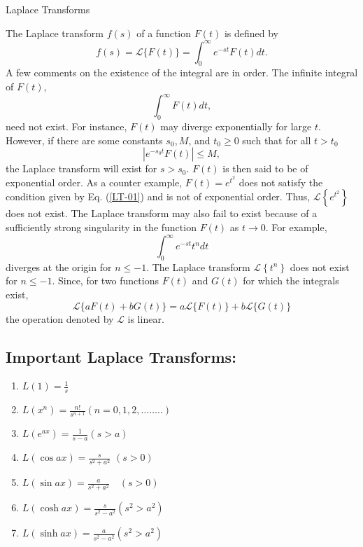 \begin{abox}
	Laplace Transforms
	\end{abox}

The Laplace transform $f(s)$ of a function $F(t)$ is defined by 
\begin{equation}
f(s)=\mathcal{L}\{F(t)\}=\int_{0}^{\infty} e^{-s t} F(t) d t .
\end{equation}
A few comments on the existence of the integral are in order. The infinite integral of $F(t)$,
\begin{equation*}
\int_{0}^{\infty} F(t) d t,
\end{equation*}
need not exist. For instance, $F(t)$ may diverge exponentially for large $t$. However, if there are some constants $s_{0}, M$, and $t_{0} \geq 0$ such that for all $t>t_{0}$
\begin{equation}
\left|e^{-s_{0} t} F(t)\right| \leq M,\label{LT-01}
\end{equation}
the Laplace transform will exist for $s>s_{0} $. $F(t)$ is then said to be of exponential order. As a counter example, $F(t)=e^{t^{2}}$ does not satisfy the condition given by Eq. (\ref{LT-01}) and is not of exponential order. Thus, $\mathcal{L}\left\{e^{t^{2}}\right\}$ does not exist.
The Laplace transform may also fail to exist because of a sufficiently strong singularity in the function $F(t)$ as $t \rightarrow 0$. For example,
\begin{equation*}
\int_{0}^{\infty} e^{-s t} t^{n} d t
\end{equation*}
diverges at the origin for $n \leq-1$. The Laplace transform $\mathcal{L}\left\{t^{n}\right\}$ does not exist for $n \leq-1$. Since, for two functions $F(t)$ and $G(t)$ for which the integrals exist,
\begin{equation}
\mathcal{L}\{a F(t)+b G(t)\}=a \mathcal{L}\{F(t)\}+b \mathcal{L}\{G(t)\}
\end{equation}
the operation denoted by $\mathcal{L}$ is linear.\\
\subsection{Important Laplace Transforms:}
\begin{enumerate}
	\item $L(1)=\frac{1}{s}$
	\item $L\left(x^{n}\right)=\frac{n !}{s^{n+1}}(n=0,1,2, \ldots \ldots . .)$
	\item $L\left(e^{a x}\right)=\frac{1}{s-a}(s>a)$
	\item $L(\cos a x)=\frac{s}{s^{2}+a^{2}}$
	$(s>0)$
	\item $L(\sin a x)=\frac{a}{s^{2}+a^{2}} \quad(s>0)$
	\item $L(\cosh a x)=\frac{s}{s^{2}-a^{2}}\left(s^{2}>a^{2}\right)$
	\item $L(\sinh a x)=\frac{a}{s^{2}-a^{2}}\left(s^{2}>a^{2}\right)$
\end{enumerate}

